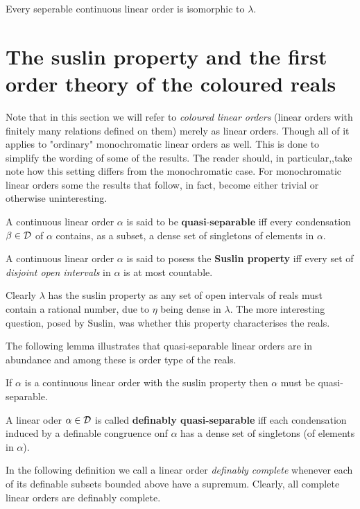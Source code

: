 	\begin{thm}\label{thm:rchar}
		Every seperable continuous linear order is isomorphic to $\lambda$.
	\end{thm}


	\section{The  suslin property and the first order theory of the coloured reals}

	Note that in this section we will refer to \textit{coloured linear orders} (linear orders with finitely many relations defined on them) merely as linear orders.  Though all of it applies to "ordinary" monochromatic linear orders as well.  This is done to simplify the wording of some of the results.  The reader should, in particular,,take note how this setting differs from the monochromatic case.  For monochromatic linear orders some the results that follow, in fact, become either trivial or otherwise uninteresting.

	\begin{dfn}
		A continuous linear order $\alpha$ is said to be $\textbf{quasi-separable}$ iff every condensation $\beta\in\mathcal{D}$ of $\alpha$ contains, as a subset, a dense set of singletons of elements in $\alpha$.
	\end{dfn}

	\begin{dfn}
		A continuous linear order $\alpha$ is said to posess the \textbf{Suslin property} iff every set of \textit{disjoint open intervals} in $\alpha$ is at most countable.
	\end{dfn}

	Clearly $\lambda$ has the suslin property as any set of open intervals of reals must contain a rational number, due to $\eta$ being dense in $\lambda$.  The more interesting question, posed by Suslin, was whether this property characterises the reals.

	The following lemma illustrates that quasi-separable linear orders are in abundance and among these is order type of the reals.

	\begin{prp}
		If $\alpha$ is a continuous linear order with the suslin property then $\alpha$ must be quasi-separable.
	\end{prp}

	\begin{dfn}
		A linear oder $\alpha\in\mathcal{D}$ is called \textbf{definably quasi-separable} iff each condensation induced by a definable congruence onf $\alpha$ has a dense set of singletons (of elements in $\alpha$).
	\end{dfn}
	In the following definition we call a linear order \textit{definably complete} whenever each of its definable subsets bounded above have a supremum.  Clearly, all complete linear orders are definably complete.

